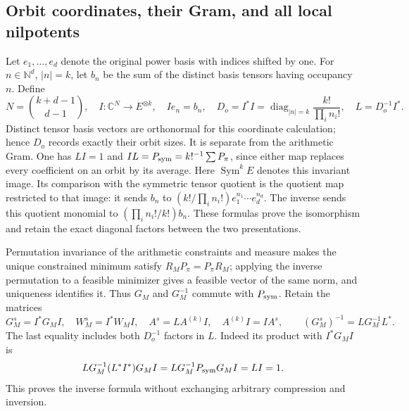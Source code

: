 \subsection{Orbit coordinates, their Gram, and all local nilpotents}

Let \(e_1,\ldots,e_d\) denote the original power basis with
indices shifted by one.  For \(n\in\mathbb N^d\),
\(|n|=k\), let \(b_n\) be the sum of the distinct basis
tensors having occupancy \(n\).  Define
\[
 N=\binom{k+d-1}{d-1},\quad
 I:\mathbb C^N\longrightarrow E^{\otimes k},\quad
 I e_n=b_n,\quad D_o=I^*I
      =\operatorname{diag}_{|n|=k}\frac{k!}{\prod_i n_i!},
 \quad L=D_o^{-1}I^*.                                  \tag{SS.10}
\]
Distinct tensor basis vectors are orthonormal for this coordinate
calculation; hence \(D_o\) records exactly their orbit sizes.
It is separate from the arithmetic Gram.  One has \(LI=1\)
and \(IL=P_{\rm sym}=k!^{-1}\sum P_\pi\), since either
map replaces every coefficient on an orbit by its average.
Here \(\operatorname{Sym}^kE\) denotes this invariant image.
Its comparison with the symmetric tensor quotient is the quotient
map restricted to that image: it sends
\(b_n\) to \((k!/\prod_i n_i!)e_1^{n_1}\cdots e_d^{n_d}\).
The inverse sends this quotient monomial to
\((\prod_i n_i!/k!)b_n\).  These formulas prove the
isomorphism and retain the exact diagonal factors between the two
presentations.

Permutation invariance of the arithmetic constraints and measure
makes the unique constrained minimum satisfy
\(R_MP_\pi=P_\pi R_M\); applying the inverse permutation
to a feasible minimizer gives a feasible vector of the same norm,
and uniqueness identifies it.  Thus \(G_M\) and \(G_M^{-1}\)
commute with \(P_{\rm sym}\).  Retain the matrices
\[
 G_M^s=I^*G_MI,\quad W_M^s=I^*W_MI,\quad
 A^s=LA^{(k)}I,\quad A^{(k)}I=IA^s,
 \qquad (G_M^s)^{-1}=L G_M^{-1}L^*.                    \tag{SS.11}
\]
The last equality includes both \(D_o^{-1}\) factors in \(L\).
Indeed its product with \(I^*G_MI\) is
\[
 L G_M^{-1}(L^*I^*)G_MI
 =L G_M^{-1}P_{\rm sym}G_MI=LI=1.
\]
This proves the inverse formula without exchanging
arbitrary compression and inversion.

